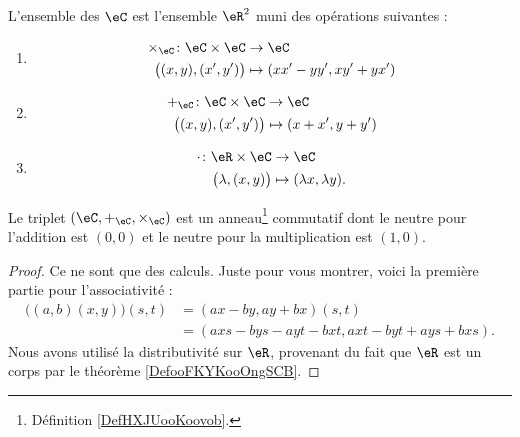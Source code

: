 \begin{definition}
	L'ensemble des  \( \eC\) est l'ensemble \( \eR^2\) muni des opérations suivantes :
	\begin{enumerate}
		\item
		      \begin{equation}        \label{EQooIJWOooZBiKEW}
			      \begin{aligned}
				      \times_{\eC}\colon \eC\times \eC & \to \eC                    \\
				      \big( (x,y),(x',y') \big)        & \mapsto (xx'-yy', xy'+yx')
			      \end{aligned}
		      \end{equation}
		\item
		      \begin{equation}
			      \begin{aligned}
				      +_{\eC}\colon \eC\times \eC & \to \eC              \\
				      \big( (x,y),(x',y') \big)   & \mapsto (x+x', y+y')
			      \end{aligned}
		      \end{equation}
		\item
		      \begin{equation}
			      \begin{aligned}
				      \cdot\colon \eR\times \eC & \to \eC                         \\
				      \big( \lambda,(x,y) \big) & \mapsto (\lambda x, \lambda y).
			      \end{aligned}
		      \end{equation}
	\end{enumerate}
\end{definition}

\begin{lemma}
	Le triplet \( (\eC,+_{\eC}, \times_{\eC})\) est un anneau\footnote{Définition \ref{DefHXJUooKoovob}.} commutatif dont le neutre pour l'addition est \( (0,0)\) et le neutre pour la multiplication est \( (1,0)\).
\end{lemma}

\begin{proof}
	Ce ne sont que des calculs. Juste pour vous montrer, voici la première partie pour l'associativité :
	\begin{subequations}
		\begin{align}
			\big( (a,b)(x,y) \big)(s,t) & =(ax-by,ay+bx)(s,t)                 \\
			                            & =(axs-bys-ayt-bxt,axt-byt+ays+bxs).
		\end{align}
	\end{subequations}
	Nous avons utilisé la distributivité sur \( \eR\), provenant du fait que \( \eR\) est un corps par le théorème \ref{DefooFKYKooOngSCB}.
\end{proof}


